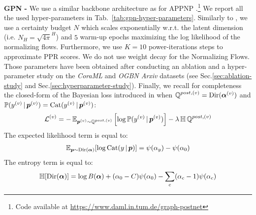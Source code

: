 \textbf{GPN - } We use a similar backbone architecture as for APPNP \citep{Klicpera2018}.\footnote{Code available at \url{https://www.daml.in.tum.de/graph-postnet}} We report all the used hyper-parameters in Tab.~\ref{tab:gpn-hyper-parameters}. Similarly to \citep{NatPN2021}, we use a certainty budget $N$ which scales exponentially w.r.t. the latent dimension (i.e. $N_H=\sqrt{4 \pi}^H$) and $5$ warm-up epochs maximizing the log likelihood of the normalizing flows. Furthermore, we use $K=10$ power-iterations steps to approximate PPR scores. We do not use weight decay for the Normalizing Flows. Those parameters have been obtained after conducting an ablation and a hyper-parameter study on the \emph{CoraML} and \emph{OGBN Arxiv} datasets (see Sec.\ref{sec:ablation-study} and Sec.\ref{sec:hyperparameter-study}). Finally, we recall for completeness the closed-form of the Bayesian loss introduced in \citep{charpentier2020} when $\operatorname{\mathbb{Q}}^{post, (v)}=\operatorname{Dir}(\bm{\alpha}^{(v)})$ and $\mathbb{P}(y^{(v)} \,|\, \bm{p}^{(v)}) = \operatorname{Cat}(y^{(v)} \,|\, \bm{p}^{(v)})$:
\begin{equation}
    \operatorname{\mathcal{L}}^{(v)} = -\operatorname{\mathbb{E}}_{\bm{p}^{(v)}\sim \operatorname{\mathbb{Q}}^{post, (v)}}\left[\log \mathbb{P}(y^{(v)} \,|\, \bm{p}^{(v)})\right] - \lambda \operatorname{\mathbb{H}}{\operatorname{\mathbb{Q}}^{post, (v)}}
\end{equation}
The expected likelihood term is equal to:
\begin{align}\label{eq:expected-likelihood-cat-dir}
    \operatorname{\mathbb{E}}_{\bm{p} \sim \operatorname{Dir}(\bm{\alpha})}[\log \operatorname{Cat}(y \,|\, \bm{p})] = \psi(\alpha_{y}) - \psi(\alpha_0)
\end{align}
The entropy term is equal to:
\begin{align}\label{eq:density-entropy-dirichlet}
        \operatorname{\mathbb{H}}[\operatorname{Dir}(\bm{\alpha})] = \log B(\bm{\alpha}) + (\alpha_0 - C) \psi(\alpha_0) - \sum_c (\alpha_c - 1) \psi(\alpha_c)
\end{align}



